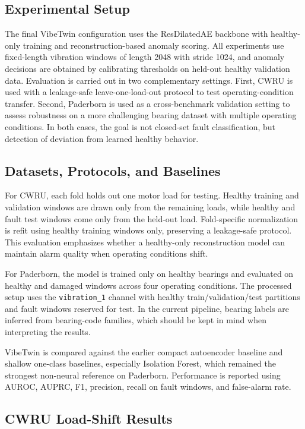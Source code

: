 \subsection{Experimental Setup}

The final VibeTwin configuration uses the ResDilatedAE backbone with healthy-only training and reconstruction-based anomaly scoring. All experiments use fixed-length vibration windows of length 2048 with stride 1024, and anomaly decisions are obtained by calibrating thresholds on held-out healthy validation data. Evaluation is carried out in two complementary settings. First, CWRU is used with a leakage-safe leave-one-load-out protocol to test operating-condition transfer. Second, Paderborn is used as a cross-benchmark validation setting to assess robustness on a more challenging bearing dataset with multiple operating conditions. In both cases, the goal is not closed-set fault classification, but detection of deviation from learned healthy behavior.

\subsection{Datasets, Protocols, and Baselines}

For CWRU, each fold holds out one motor load for testing. Healthy training and validation windows are drawn only from the remaining loads, while healthy and fault test windows come only from the held-out load. Fold-specific normalization is refit using healthy training windows only, preserving a leakage-safe protocol. This evaluation emphasizes whether a healthy-only reconstruction model can maintain alarm quality when operating conditions shift.

For Paderborn, the model is trained only on healthy bearings and evaluated on healthy and damaged windows across four operating conditions. The processed setup uses the \texttt{vibration\_1} channel with healthy train/validation/test partitions and fault windows reserved for test. In the current pipeline, bearing labels are inferred from bearing-code families, which should be kept in mind when interpreting the results.

VibeTwin is compared against the earlier compact autoencoder baseline and shallow one-class baselines, especially Isolation Forest, which remained the strongest non-neural reference on Paderborn. Performance is reported using AUROC, AUPRC, F1, precision, recall on fault windows, and false-alarm rate.

\subsection{CWRU Load-Shift Results}

